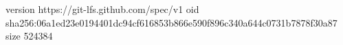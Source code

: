 version https://git-lfs.github.com/spec/v1
oid sha256:06a1ed23e0194401dc94cf616853b866e590f896c340a644c0731b7878f30a87
size 524384
